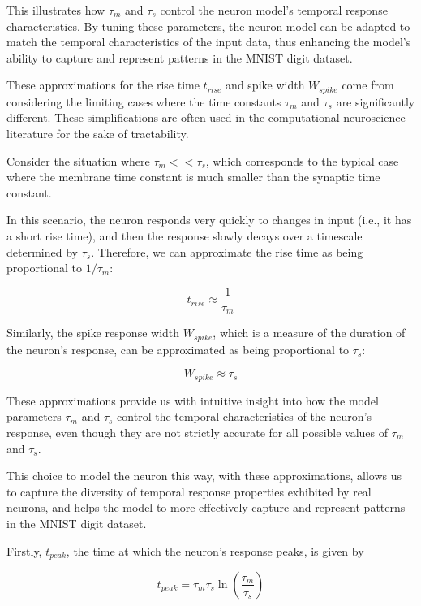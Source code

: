 This illustrates how $\tau_m$ and $\tau_s$ control the neuron model's temporal response characteristics. By tuning these parameters, the neuron model can be adapted to match the temporal characteristics of the input data, thus enhancing the model's ability to capture and represent patterns in the MNIST digit dataset.


These approximations for the rise time $t_{rise}$ and spike width $W_{spike}$ come from considering the limiting cases where the time constants $\tau_m$ and $\tau_s$ are significantly different. These simplifications are often used in the computational neuroscience literature for the sake of tractability.

Consider the situation where $\tau_m << \tau_s$, which corresponds to the typical case where the membrane time constant is much smaller than the synaptic time constant.

In this scenario, the neuron responds very quickly to changes in input (i.e., it has a short rise time), and then the response slowly decays over a timescale determined by $\tau_s$. Therefore, we can approximate the rise time as being proportional to $1/\tau_m$:

\begin{equation}
t_{rise} \approx \frac{1}{\tau_m}
\end{equation}

Similarly, the spike response width $W_{spike}$, which is a measure of the duration of the neuron's response, can be approximated as being proportional to $\tau_s$:

\begin{equation}
W_{spike} \approx \tau_s
\end{equation}

These approximations provide us with intuitive insight into how the model parameters $\tau_m$ and $\tau_s$ control the temporal characteristics of the neuron's response, even though they are not strictly accurate for all possible values of $\tau_m$ and $\tau_s$.

This choice to model the neuron this way, with these approximations, allows us to capture the diversity of temporal response properties exhibited by real neurons, and helps the model to more effectively capture and represent patterns in the MNIST digit dataset.



Firstly, $t_{peak}$, the time at which the neuron's response peaks, is given by

\begin{equation}
t_{peak} = \tau_m \tau_s \ln\left(\frac{\tau_m}{\tau_s}\right)
\end{equation}

